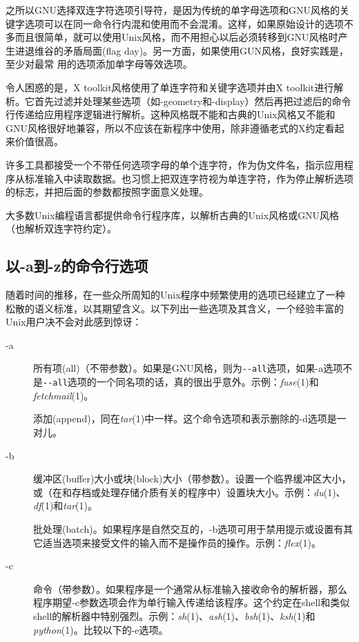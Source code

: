 \documentclass[12pt,oneside]{book}
\begin{document}
\begin{common-format}
之所以GNU选择双连字符选项引导符，是因为传统的单字母选项和GNU风格的关键字选项可以在同一命令行内混和使用而不会混淆。这样，如果原始设计的选项不多而且很简单，就可以使用Unix风格，而不用担心以后必须转移到GNU风格时产生进退维谷的矛盾局面(flag day)。另一方面，如果使用GUN风格，良好实践是，至少对最常
用的选项添加单字母等效选项。

令人困惑的是，X toolkit风格使用了单连字符和关键字选项并由X toolkit进行解析。它首先过滤并处理某些选项（如-geometry和-display）然后再把过滤后的命令行传递给应用程序逻辑进行解析。这种风格既不能和古典的Unix风格又不能和GNU风格很好地兼容，所以不应该在新程序中使用，除非遵循老式的X约定看起来价值很高。

许多工具都接受一个不带任何选项字母的单个连字符，作为伪文件名，指示应用程序从标准输入中读取数据。也习惯上把双连字符视为单连字符，作为停止解析选项的标志，并把后面的参数都按照字面意义处理。

大多数Unix编程语言都提供命令行程序库，以解析古典的Unix风格或GNU风格（也解析双连字符约定）。

\subsection{以-a到-z的命令行选项}
随着时间的推移，在一些众所周知的Unix程序中频繁使用的选项已经建立了一种松散的语义标准，以其期望含义。以下列出一些选项及其含义，一个经验丰富的Unix用户决不会对此感到惊讶：
\begin{description}
\item[-a] 所有项(all)（不带参数）。如果是GNU风格，则为\verb+--all+选项，如果-a选项不是\verb+--all+选项的一个同名项的话，真的很出乎意外。示例：\textit{fuse}(1)和\textit{fetchmail}(1)。

添加(append)，同在\textit{tar}(1)中一样。这个命令选项和表示删除的-d选项是一对儿。
\item[-b] 缓冲区(buffer)大小或块(block)大小（带参数）。设置一个临界缓冲区大小，或（在和存档或处理存储介质有关的程序中）设置块大小。示例：\textit{du}(1)、\textit{df}(1)和\textit{tar}(1)。

批处理(batch)。如果程序是自然交互的，-b选项可用于禁用提示或设置有其它适当选项来接受文件的输入而不是操作员的操作。示例：\textit{flex}(1)。
\item[-c] 命令（带参数）。如果程序是一个通常从标准输入接收命令的解析器，那么程序期望-c参数选项会作为单行输入传递给该程序。这个约定在shell和类似shell的解析器中特别强烈。示例：\textit{sh}(1)、\textit{ash}(1)、\textit{bsh}(1)、\textit{ksh}(1)和\textit{python}(1)。比较以下的-e选项。


\end{description}
\end{common-format}
\end{document}
